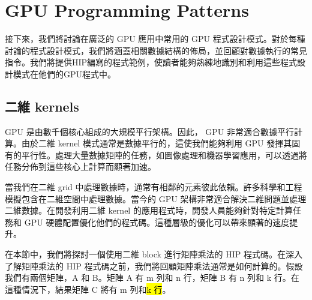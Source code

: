 \usepackage{listings}
\usepackage{xcolor}
\chapter{GPU Programming Patterns} \label{chap:GPU_programming_patterns}
接下來，我們將討論在廣泛的 GPU 應用中常用的 GPU 程式設計模式。對於每種討論的程式設計模式，我們將涵蓋相關數據結構的佈局，並回顧對數據執行的常見指令。我們將提供HIP編寫的程式範例，使讀者能夠熟練地識別和利用這些程式設計模式在他們的GPU程式中。

\section{二維 kernels}
GPU 是由數千個核心組成的大規模平行架構。因此， GPU 非常適合數據平行計算。由於二維 kernel 模式通常是數據平行的，這使我們能夠利用 GPU 發揮其固有的平行性。處理大量數據矩陣的任務，如圖像處理和機器學習應用，可以透過將任務分佈到這些核心上計算而顯著加速。

當我們在二維 grid 中處理數據時，通常有相鄰的元素彼此依賴。許多科學和工程模擬包含在二維空間中處理數據。當今的 GPU 架構非常適合解決二維問題並處理二維數據。在開發利用二維 kernel 的應用程式時，開發人員能夠針對特定計算任務和 GPU 硬體配置優化他們的程式碼。這種層級的優化可以帶來顯著的速度提升。

在本節中，我們將探討一個使用二維 block 進行矩陣乘法的 HIP 程式碼\cite{Gilbert2009Linear}。在深入了解矩陣乘法的 HIP 程式碼之前，我們將回顧矩陣乘法通常是如何計算的。假設我們有兩個矩陣，A 和 B。矩陣 A 有 m 列和 n 行，矩陣 B 有 n 列和 k 行。在這種情況下，結果矩陣 C 將有 m 列和\hl{k 行}。


